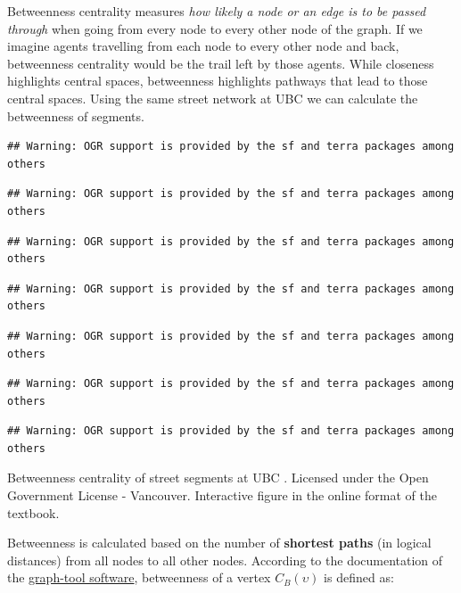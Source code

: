 \documentclass[
]{book}
\begin{document}
Betweenness centrality measures \emph{how likely a node or an edge is to be passed through} when going from every node to every other node of the graph. If we imagine agents travelling from each node to every other node and back, betweenness centrality would be the trail left by those agents. While closeness highlights central spaces, betweenness highlights pathways that lead to those central spaces. Using the same street network at UBC we can calculate the betweenness of segments.

\begin{verbatim}
## Warning: OGR support is provided by the sf and terra packages among others
\end{verbatim}

\begin{verbatim}
## Warning: OGR support is provided by the sf and terra packages among others
\end{verbatim}

\begin{verbatim}
## Warning: OGR support is provided by the sf and terra packages among others
\end{verbatim}

\begin{verbatim}
## Warning: OGR support is provided by the sf and terra packages among others
\end{verbatim}

\begin{verbatim}
## Warning: OGR support is provided by the sf and terra packages among others
\end{verbatim}

\begin{verbatim}
## Warning: OGR support is provided by the sf and terra packages among others
\end{verbatim}

\begin{verbatim}
## Warning: OGR support is provided by the sf and terra packages among others
\end{verbatim}

\label{fig:8-betweenness-centrality}Betweenness centrality of street segments at UBC \citep{city_of_vancouver_open_nodate}. Licensed under the Open Government License - Vancouver. Interactive figure in the online format of the textbook.

Betweenness is calculated based on the number of \textbf{shortest paths} (in logical distances) from all nodes to all other nodes. According to the documentation of the \href{https://graph-tool.skewed.de/static/doc/centrality.html}{graph-tool software}, betweenness of a vertex \(C_{B}(\upsilon)\) is defined as:
\end{document}
